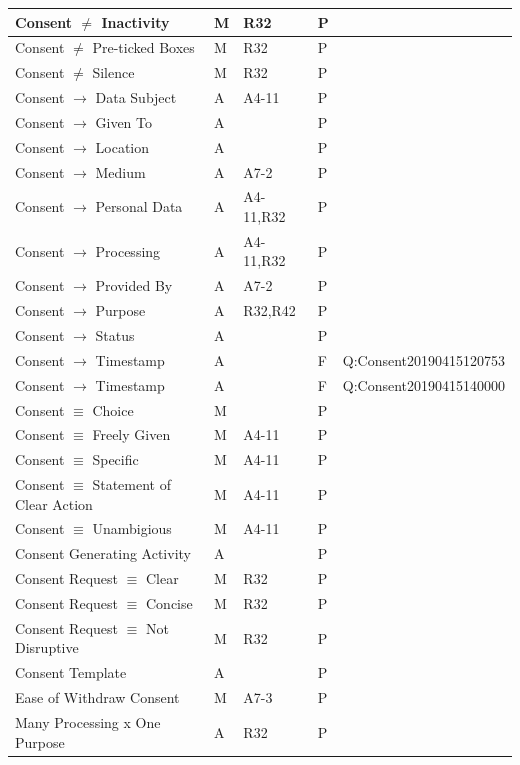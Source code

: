 \begin{center}
\begin{tabularx}{\linewidth}{|l|X|X|X|l|}
Consent $\neq$ Inactivity & M & R32 & P &  \\ \hline
Consent $\neq$ Pre-ticked Boxes & M & R32 & P &  \\ \hline
Consent $\neq$ Silence & M & R32 & P &  \\ \hline
Consent $\rightarrow$ Data Subject & A & A4-11 & P &  \\ \hline
Consent $\rightarrow$ Given To & A &  & P &  \\ \hline
Consent $\rightarrow$ Location & A &  & P &  \\ \hline
Consent $\rightarrow$ Medium & A & A7-2 & P &  \\ \hline
Consent $\rightarrow$ Personal Data & A & A4-11,R32 & P &  \\ \hline
Consent $\rightarrow$ Processing & A & A4-11,R32 & P &  \\ \hline
Consent $\rightarrow$ Provided By & A & A7-2 & P &  \\ \hline
Consent $\rightarrow$ Purpose & A & R32,R42 & P &  \\ \hline
Consent $\rightarrow$ Status & A &  & P &  \\ \hline
\rowcolor{lightred} Consent $\rightarrow$ Timestamp & A &  & F & Q:Consent20190415120753 \\ \hline
\rowcolor{lightred} Consent $\rightarrow$ Timestamp & A &  & F & Q:Consent20190415140000 \\ \hline
Consent $\equiv$ Choice & M &  & P &  \\ \hline
Consent $\equiv$ Freely Given & M & A4-11 & P &  \\ \hline
Consent $\equiv$ Specific & M & A4-11 & P &  \\ \hline
Consent $\equiv$ Statement of Clear Action & M & A4-11 & P &  \\ \hline
Consent $\equiv$ Unambigious & M & A4-11 & P &  \\ \hline
Consent Generating Activity & A &  & P &  \\ \hline
Consent Request $\equiv$ Clear & M & R32 & P &  \\ \hline
Consent Request $\equiv$ Concise & M & R32 & P &  \\ \hline
Consent Request $\equiv$ Not Disruptive & M & R32 & P &  \\ \hline
Consent Template & A &  & P &  \\ \hline
Ease of Withdraw Consent & M & A7-3 & P &  \\ \hline
Many Processing x One Purpose & A & R32 & P &  \\ \hline

\end{tabularx}
\end{center}
